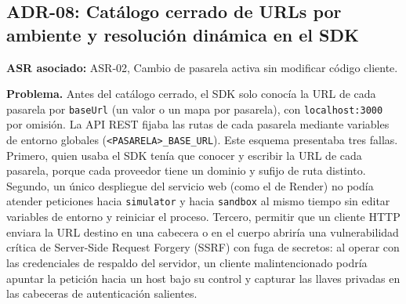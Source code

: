 \subsection{ADR-08: Catálogo cerrado de URLs por ambiente y resolución dinámica en el SDK}
\textbf{ASR asociado:} ASR-02, Cambio de pasarela activa sin modificar código cliente.

\textbf{Problema.} Antes del catálogo cerrado, el SDK solo conocía la URL de cada pasarela por \texttt{baseUrl} (un valor o un mapa por pasarela), con \texttt{localhost:3000} por omisión. La API REST fijaba las rutas de cada pasarela mediante variables de entorno globales (\texttt{<PASARELA>\_BASE\_URL}). Este esquema presentaba tres fallas. Primero, quien usaba el SDK tenía que conocer y escribir la URL de cada pasarela, porque cada proveedor tiene un dominio y sufijo de ruta distinto. Segundo, un único despliegue del servicio web (como el de Render) no podía atender peticiones hacia \texttt{simulator} y hacia \texttt{sandbox} al mismo tiempo sin editar variables de entorno y reiniciar el proceso. Tercero, permitir que un cliente HTTP enviara la URL destino en una cabecera o en el cuerpo abriría una vulnerabilidad crítica de Server-Side Request Forgery (SSRF) con fuga de secretos: al operar con las credenciales de respaldo del servidor, un cliente malintencionado podría apuntar la petición hacia un host bajo su control y capturar las llaves privadas en las cabeceras de autenticación salientes.

